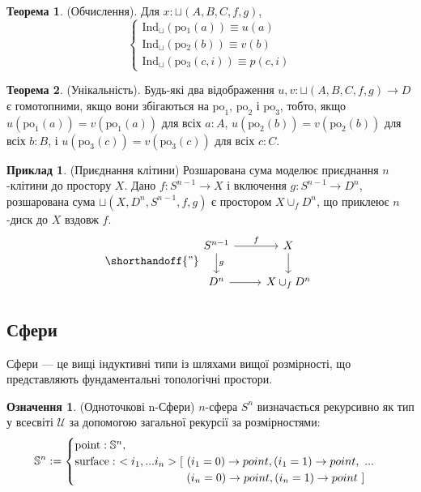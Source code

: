 \documentclass{article}
\theoremstyle{definition}
\newtheorem{theorem}{Теорема}
\newtheorem{definition}{Означення}
\newtheorem{example}{Приклад}
\begin{document}
\begin{theorem} (Обчислення).
Для \( x : \sqcup(A,B,C,f,g) \),
\[
\begin{cases}
\text{Ind$_\sqcup$}(\text{po$_1$}(a)) \equiv u(a) \\
\text{Ind$_\sqcup$}(\text{po$_2$}(b)) \equiv v(b) \\
\text{Ind$_\sqcup$}(\text{po$_3$}(c,i)) \equiv p(c,i)
\end{cases}
\]
\end{theorem}

\begin{theorem} (Унікальність).
Будь-які два відображення \( u, v : \sqcup(A,B,C,f,g) \to D \) є гомотопними,
якщо вони збігаються на \( \text{po}_1 \), \( \text{po}_2 \) і \( \text{po}_3 \), тобто,
якщо \( u(\text{po}_1(a)) = v(\text{po}_1(a)) \) для всіх \( a : A \), \( u(\text{po}_2(b)) = v(\text{po}_2(b)) \)
для всіх \( b : B \), і \( u(\text{po}_3(c)) = v(\text{po}_3(c)) \) для всіх \( c : C \).
\end{theorem}

\begin{example} (Приєднання клітини)
Розшарована сума моделює приєднання \( n \)-клітини до простору \( X \).
Дано \( f : S^{n-1} \to X \) і включення \( g : S^{n-1} \to D^n \),
розшарована сума \( \sqcup(X,D^n,S^{n-1},f,g) \) є
простором \( X \cup_f D^n \), що приклеює \( n \)-диск до \( X \) вздовж \( f \).
\[
\shorthandoff{"}
\begin{tikzcd}
S^{n-1} \arrow[r, "f"] \arrow[d, "g"] & X \arrow[d] \\
D^n \arrow[r] & X \cup_f D^n
\end{tikzcd}
\]
\end{example}

\subsection{Сфери}
Сфери — це вищі індуктивні типи із шляхами вищої розмірності,
що представляють фундаментальні топологічні простори.

\begin{definition} (Одноточкові n-Сфери)
\( n \)-сфера \( S^n \) визначається рекурсивно як тип у
всесвіті \( \mathcal{U} \) за допомогою загальної рекурсії за розмірностями:
\[
\mathbb{S}^n :=
\begin{cases}
\text{point} : \mathbb{S}^n, \\
\text{surface} :\ <i_1,...i_n> [\ (i_1=0) \rightarrow point, (i_1=1) \rightarrow point,\ ... \\
\hspace{3.47cm} (i_n=0) \rightarrow point, (i_n=1) \rightarrow point\ ]
\end{cases}
\]
\end{definition}
\end{document}
